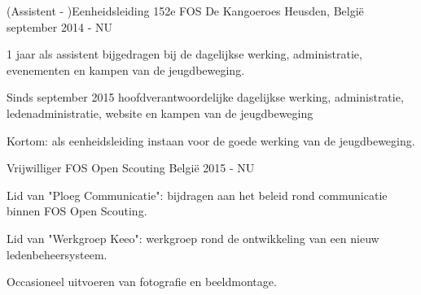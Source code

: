 


\begin{cventries}


\cventry
{(Assistent - )Eenheidsleiding} %
{152e FOS De Kangoeroes} %
{Heusden, België} %
{september 2014 - NU} %
{ %
\begin{cvitems}
\item {1 jaar als assistent bijgedragen bij de dagelijkse werking, administratie, evenementen en kampen van de jeugdbeweging.}
\item {Sinds  september 2015 hoofdverantwoordelijke dagelijkse werking, administratie, ledenadministratie, website en kampen van de jeugdbeweging}
\item {Kortom: als eenheidsleiding instaan voor de goede werking van de jeugdbeweging.}
\end{cvitems}
}

\cventry
{Vrijwilliger} %
{FOS Open Scouting} %
{België} %
{2015 - NU} %
{ %
	\begin{cvitems}
		\item {Lid van "Ploeg Communicatie": bijdragen aan het beleid rond communicatie binnen FOS Open Scouting.}
		\item {Lid van "Werkgroep Keeo": werkgroep rond de ontwikkeling van een nieuw ledenbeheersysteem.}
		\item {Occasioneel uitvoeren van fotografie en beeldmontage.}		
	\end{cvitems}
}







\end{cventries}